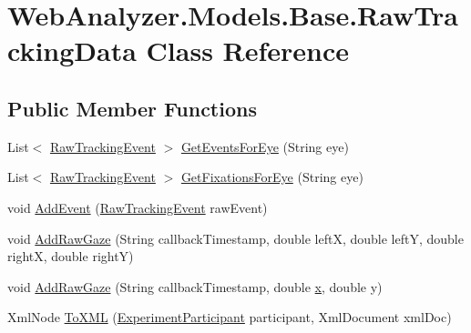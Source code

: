 \hypertarget{class_web_analyzer_1_1_models_1_1_base_1_1_raw_tracking_data}{}\section{Web\+Analyzer.\+Models.\+Base.\+Raw\+Tracking\+Data Class Reference}
\label{class_web_analyzer_1_1_models_1_1_base_1_1_raw_tracking_data}
\subsection*{Public Member Functions}
\begin{DoxyCompactItemize}
\item 
List$<$ \hyperlink{class_web_analyzer_1_1_models_1_1_base_1_1_raw_tracking_event}{Raw\+Tracking\+Event} $>$ \hyperlink{class_web_analyzer_1_1_models_1_1_base_1_1_raw_tracking_data_a7b99eb9ecc19bc3dc012deecb687dc70}{Get\+Events\+For\+Eye} (String eye)
\item 
List$<$ \hyperlink{class_web_analyzer_1_1_models_1_1_base_1_1_raw_tracking_event}{Raw\+Tracking\+Event} $>$ \hyperlink{class_web_analyzer_1_1_models_1_1_base_1_1_raw_tracking_data_ab3a2654d87bb9a265b4f58ee3eddc7a5}{Get\+Fixations\+For\+Eye} (String eye)
\item 
void \hyperlink{class_web_analyzer_1_1_models_1_1_base_1_1_raw_tracking_data_ab923bf3a6c112dacfbfe7b81cd45cc17}{Add\+Event} (\hyperlink{class_web_analyzer_1_1_models_1_1_base_1_1_raw_tracking_event}{Raw\+Tracking\+Event} raw\+Event)
\item 
void \hyperlink{class_web_analyzer_1_1_models_1_1_base_1_1_raw_tracking_data_a18713a7b31b580b2a632b0a2d9328a4f}{Add\+Raw\+Gaze} (String callback\+Timestamp, double left\+X, double left\+Y, double right\+X, double right\+Y)
\item 
void \hyperlink{class_web_analyzer_1_1_models_1_1_base_1_1_raw_tracking_data_ace73396d140d332459ad945ff17a0758}{Add\+Raw\+Gaze} (String callback\+Timestamp, double \hyperlink{_u_i_2_h_t_m_l_resources_2js_2lib_2underscore_8min_8js_a81e910173af87b1161e719a504d52407}{x}, double y)
\item 
Xml\+Node \hyperlink{class_web_analyzer_1_1_models_1_1_base_1_1_raw_tracking_data_ae75cfde7e7b9a1e236b99c3f07f7487e}{To\+X\+M\+L} (\hyperlink{class_web_analyzer_1_1_models_1_1_base_1_1_experiment_participant}{Experiment\+Participant} participant, Xml\+Document xml\+Doc)
\end{DoxyCompactItemize}
